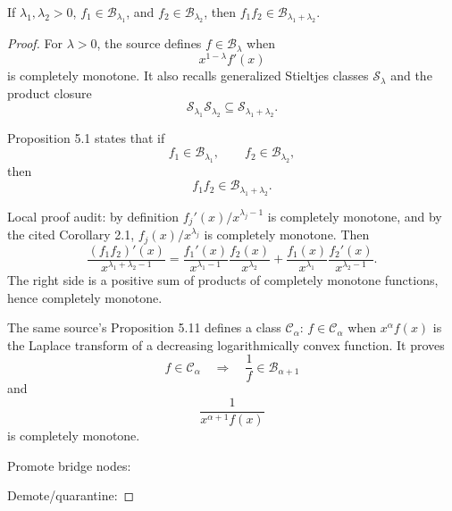 \begin{lemma}
\label{res:gbf-product-closure}
If \(\lambda_1,\lambda_2>0\), \(f_1\in\mathcal B_{\lambda_1}\), and \(f_2\in\mathcal B_{\lambda_2}\), then \(f_1f_2\in\mathcal B_{\lambda_1+\lambda_2}\).
\end{lemma}
\begin{proof}
For \(\lambda>0\), the source defines \(f\in\mathcal B_\lambda\) when
\[
x^{1-\lambda}f'(x)
\]
is completely monotone. It also recalls generalized Stieltjes classes \(\mathcal S_\lambda\) and the product closure
\[
\mathcal S_{\lambda_1}\mathcal S_{\lambda_2}\subseteq \mathcal S_{\lambda_1+\lambda_2}.
\]

Proposition 5.1 states that if
\[
f_1\in\mathcal B_{\lambda_1},\qquad f_2\in\mathcal B_{\lambda_2},
\]
then
\[
f_1f_2\in\mathcal B_{\lambda_1+\lambda_2}.
\]

Local proof audit: by definition \(f_j'(x)/x^{\lambda_j-1}\) is completely monotone, and by the cited Corollary 2.1, \(f_j(x)/x^{\lambda_j}\) is completely monotone. Then
\[
\frac{(f_1f_2)'(x)}{x^{\lambda_1+\lambda_2-1}}
=
\frac{f_1'(x)}{x^{\lambda_1-1}}\frac{f_2(x)}{x^{\lambda_2}}
+
\frac{f_1(x)}{x^{\lambda_1}}\frac{f_2'(x)}{x^{\lambda_2-1}}.
\]
The right side is a positive sum of products of completely monotone functions, hence completely monotone.

The same source's Proposition 5.11 defines a class \(\mathcal C_\alpha\): \(f\in\mathcal C_\alpha\) when \(x^\alpha f(x)\) is the Laplace transform of a decreasing logarithmically convex function. It proves
\[
f\in\mathcal C_\alpha
\quad\Longrightarrow\quad
\frac1f\in\mathcal B_{\alpha+1}
\]
and
\[
\frac{1}{x^{\alpha+1}f(x)}
\]
is completely monotone.

Promote bridge nodes:

Demote/quarantine:
\end{proof}


